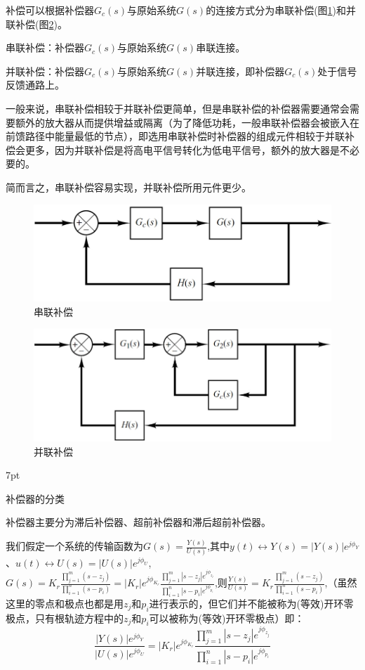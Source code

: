 \documentclass{article}
\numberwithin{equation}{section}
\numberwithin{figure}{section}
\newenvironment{formal}{%
\def\FrameCommand{%
\hspace{1pt}%
{\color{DarkBlue}\vrule width 2pt}%
{\color{formalshade}\vrule width 4pt}%
\colorbox{formalshade}%
}%
\MakeFramed{\advance\hsize-\width\FrameRestore}%
\noindent\hspace{-4.55pt}%
\begin{adjustwidth}{}{7pt}%
\vspace{2pt}\vspace{2pt}%
}
{%
\vspace{2pt}\end{adjustwidth}\endMakeFramed%
}
\begin{document}
补偿可以根据补偿器$G_c(s)$与原始系统$G(s)$的连接方式分为串联补偿(图\ref{SeriesCompensation})和并联补偿(图\ref{ParallelCompensation})。

串联补偿：补偿器$G_c(s)$与原始系统$G(s)$串联连接。

并联补偿：补偿器$G_c(s)$与原始系统$G(s)$并联连接，即补偿器$G_c(s)$处于信号反馈通路上。

一般来说，串联补偿相较于并联补偿更简单，但是串联补偿的补偿器需要通常会需要额外的放大器从而提供增益或隔离（为了降低功耗，一般串联补偿器会被嵌入在前馈路径中能量最低的节点），即选用串联补偿时补偿器的组成元件相较于并联补偿会更多，因为并联补偿是将高电平信号转化为低电平信号，额外的放大器是不必要的。

简而言之，串联补偿容易实现，并联补偿所用元件更少。

\begin{figure}
    \centering
    \includegraphics[width=.6\textwidth]{Chapter6/SeriesCompensation.png} %
    \caption{串联补偿} %
    \label{SeriesCompensation} %
\end{figure}

\begin{figure}
    \centering
    \includegraphics[width=.6\textwidth]{Chapter6/ParallelCompensation.png} %
    \caption{并联补偿} %
    \label{ParallelCompensation} %
\end{figure}

\begin{formal}
    补偿器的分类
\end{formal}

补偿器主要分为滞后补偿器、超前补偿器和滞后超前补偿器。

我们假定一个系统的传输函数为$G(s)=\frac{Y(s)}{U(s)}$,其中$y(t)\leftrightarrow Y(s)=|Y(s)|e^{j\phi_Y}$、$u(t)\leftrightarrow U(s)=|U(s)|e^{j\phi_U}$,$G(s)=K_r\frac{\prod_{j=1}^{m}(s-z_j)}{\prod_{i=1}^{n}(s-p_i)}=|K_r|e^{j\phi_{K_r}}\frac{\prod_{j=1}^{m}|s-z_j|e^{j\phi_{z_j}}}{\prod_{i=1}^{n}|s-p_i|e^{j\phi_{p_i}}}$,则$\frac{Y(s)}{U(s)}=K_r\frac{\prod_{j=1}^{m}(s-z_j)}{\prod_{i=1}^{n}(s-p_i)}$,（虽然这里的零点和极点也都是用$z_j$和$p_i$进行表示的，但它们并不能被称为(等效)开环零极点，只有根轨迹方程中的$z_j$和$p_i$可以被称为(等效)开环零极点）即：
\begin{equation}
    \frac{|Y(s)|e^{j\phi_Y}}{|U(s)|e^{j\phi_U}}=|K_r|e^{j\phi_{K_r}}\frac{\prod_{j=1}^{m}|s-z_j|e^{j\phi_{z_j}}}{\prod_{i=1}^{n}|s-p_i|e^{j\phi_{p_i}}}
\end{equation}
\end{document}
